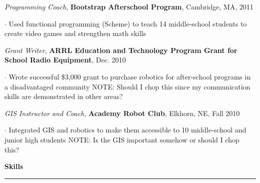 \documentclass[11pt]{article}
\begin{document}
\emph{Programming Coach}, \textbf{Bootstrap Afterschool Program}, Cambridge, MA, 2011\\
\begin{small}$\cdot$ {Used functional programming (Scheme) to teach 14 middle-school students to create video games and strengthen math skills}\end{small}

\emph{Grant Writer}, \textbf{ARRL Education and Technology Program Grant for School Radio Equipment}, Dec. 2010\\
\begin{small}$\cdot$ {Wrote successful \$3,000 grant to purchase robotics for after-school programs in a disadvantaged community NOTE: Should I chop this since my communication skills are demonstrated in other areas?}\end{small}

\emph{GIS Instructor and Coach}, \textbf{Academy Robot Club}, Elkhorn, NE, Fall 2010\\
\begin{small}$\cdot$ {Integrated GIS and robotics to make them accessible to 10 middle-school and junior high students NOTE: Is the GIS important somehow or should I chop this?}\end{small}

\smallskip
\vspace*{0.25 mm}
\textbf{Skills}
\smallskip
\hrule
\end{document}
